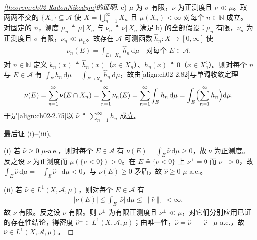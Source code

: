 \documentclass[../../main.tex]{subfiles}%
\begin{document}
\begin{proof}[\cref{theorem:ch02-RadonNikodym}的证明]
c) $\mu$ 为 $\sigma$-有限，$\nu$ 为正测度且 $\nu\ll\mu$。取两两不交的 $\{X_n\}\subseteq\mathscr A$ 使 $X=\bigcup_{n=1}^\infty X_n$ 且 $\mu(X_n)<\infty$ 对每个 $n\in\mathbb N$ 成立。对固定的 $n$，测度 $\mu_n\triangleq\mu\lfloor X_n$ 与 $\nu_n\triangleq\nu\lfloor X_n$ 满足 b) 的全部假设：$\mu_n$ 有限，$\nu_n$ 为正测度且 $\sigma$-有限，$\nu_n\ll\mu_n$。故存在 $\mathscr A$-可测函数 $\hat h_n:X\to[0,\infty]$ 使
\begin{align}
\nu_n(E)=\int_{E\cap X_n}\hat h_n\,\mathrm{d}\mu\quad\text{对每个 }E\in\mathscr A. \label{align:ch02-2.82}
\end{align}
对 $n\in\mathbb N$ 定义 $h_n(x)\triangleq\hat h_n(x)$（$x\in X_n$）、$h_n(x)\triangleq0$（$x\in X_n^c$）。则对每个 $n$ 与 $E\in\mathscr A$ 有 $\int_Eh_n\,\mathrm{d}\mu=\int_{E\cap X_n}\hat h_n\,\mathrm{d}\mu$，故由\eqref{align:ch02-2.82}与单调收敛定理
\begin{align*}
\nu(E)=\sum_{n=1}^\infty\nu(E\cap X_n)=\sum_{n=1}^\infty\nu_n(E)=\sum_{n=1}^\infty\int_Eh_n\,\mathrm{d}\mu=\int_E\Bigl(\sum_{n=1}^\infty h_n\Bigr)\mathrm{d}\mu.
\end{align*}
于是\eqref{align:ch02-2.75}以 $\hat\nu\triangleq\sum_{n=1}^\infty h_n$ 成立。

最后证 (i)--(iii)。

(i) 若 $\hat\nu\geqslant0$ $\mu$-a.e.，则对每个 $E\in\mathscr A$ 有 $\nu(E)=\int_E\hat\nu\,\mathrm{d}\mu\geqslant0$，故 $\nu$ 为正测度。反之设 $\nu$ 为正测度而 $\mu(\{\hat\nu<0\})>0$。在 $E\triangleq\{\hat\nu<0\}$ 上 $\hat\nu^+=0$ 而 $\hat\nu^->0$，故 $\int_E\hat\nu\,\mathrm{d}\mu=-\int_E\hat\nu^-\,\mathrm{d}\mu<0$，与 $\nu(E)\geqslant0$ 矛盾，故 $\hat\nu\geqslant0$ $\mu$-a.e.。

(ii) 若 $\hat\nu\in L^1(X,\mathscr A,\mu)$，则对每个 $E\in\mathscr A$ 有
\begin{align*}
|\nu(E)|\leqslant\int_E|\hat\nu|\,\mathrm{d}\mu\leqslant\|\hat\nu\|_1<\infty,
\end{align*}
故 $\nu$ 有限。反之设 $\nu$ 有限。则 $\nu^\pm$ 为有限正测度且 $\nu^\pm\ll\mu$，对它们分别应用已证的存在性结论，得密度 $\hat\nu^\pm\in L^1(X,\mathscr A,\mu)$；由唯一性，$\hat\nu=\hat\nu^+-\hat\nu^-$ $\mu$-a.e.，故 $\hat\nu\in L^1(X,\mathscr A,\mu)$。


\end{proof}
\end{document}
